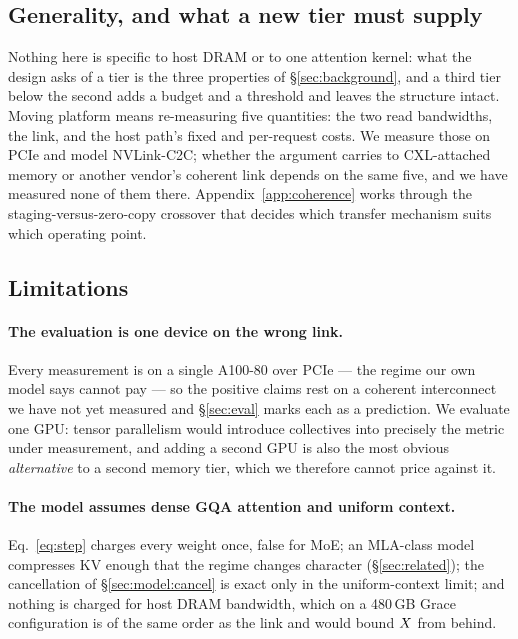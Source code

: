 \subsection{Generality, and what a new tier must supply}
\label{sec:discussion:general}

Nothing here is specific to host DRAM or to one attention kernel: what the design
asks of a tier is the three properties of \S\ref{sec:background}, and a third tier
below the second adds a budget and a threshold and leaves the structure intact. Moving platform means re-measuring five quantities: the two
read bandwidths, the link, and the host path's fixed and per-request costs. We
measure those on PCIe and model NVLink-C2C; whether the argument carries to
CXL-attached memory or another vendor's coherent link depends on the same five,
and we have measured none of them there.
Appendix~\ref{app:coherence} works through the staging-versus-zero-copy
crossover that decides which transfer mechanism suits which operating point.

\subsection{Limitations}

\paragraph{The evaluation is one device on the wrong link.} Every measurement is
on a single A100-80 over PCIe --- the regime our own model says cannot pay --- so
the positive claims rest on a coherent interconnect we have not yet measured and
\S\ref{sec:eval} marks each as a prediction. We evaluate one GPU: tensor
parallelism would introduce collectives into precisely the metric under
measurement, and adding a second GPU is also the most obvious \emph{alternative}
to a second memory tier, which we therefore cannot price against it.

\paragraph{The model assumes dense GQA attention and uniform context.}
Eq.~\ref{eq:step} charges every weight once, false for MoE; an MLA-class model
compresses KV enough that the regime changes character (\S\ref{sec:related}); the
cancellation of \S\ref{sec:model:cancel} is exact only in the uniform-context
limit; and nothing is charged for host DRAM bandwidth, which on a 480\,GB Grace
configuration is of the same order as the link and would bound $X$ from
behind.

